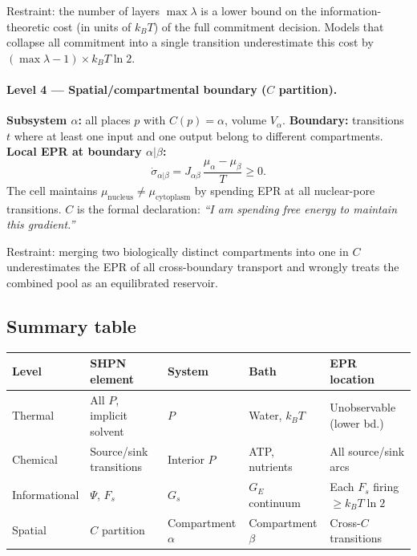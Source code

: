\documentclass[11pt,a4paper]{article}
\begin{document}
\noindent Restraint: the number of layers $\max\lambda$ is a lower bound on
the information-theoretic cost (in units of $k_BT$) of the full commitment
decision.  Models that collapse all commitment into a single transition
underestimate this cost by $(\max\lambda - 1) \times k_BT \ln 2$.

\paragraph{Level 4 --- Spatial/compartmental boundary ($C$ partition).}
\textbf{Subsystem $\alpha$:} all places $p$ with $C(p) = \alpha$, volume
$V_\alpha$.
\textbf{Boundary:} transitions $t$ where at least one input and one output
belong to different compartments.
\textbf{Local EPR at boundary $\alpha|\beta$:}
\[
  \dot\sigma_{\alpha|\beta}
    = J_{\alpha\beta}\,\frac{\mu_\alpha - \mu_\beta}{T} \geq 0.
\]
The cell maintains $\mu_{\mathrm{nucleus}} \neq \mu_{\mathrm{cytoplasm}}$
by spending EPR at all nuclear-pore transitions.
$C$ is the formal declaration: \emph{``I am spending free energy to maintain
this gradient.''}

\noindent Restraint: merging two biologically distinct compartments into one
in $C$ underestimates the EPR of all cross-boundary transport and wrongly
treats the combined pool as an equilibrated reservoir.

\subsection*{Summary table}

\begin{center}
\small
\begin{tabular}{lllll}
\toprule
\textbf{Level} & \textbf{SHPN element} & \textbf{System} & \textbf{Bath}
  & \textbf{EPR location} \\
\midrule
Thermal      & All $P$, implicit solvent & $P$             & Water, $k_BT$
  & Unobservable (lower bd.) \\
Chemical     & Source/sink transitions   & Interior $P$    & ATP, nutrients
  & All source/sink arcs \\
Informational & $\Psi$, $F_s$           & $G_s$           & $G_E$ continuum
  & Each $F_s$ firing $\geq k_BT\ln2$ \\
Spatial      & $C$ partition            & Compartment $\alpha$ & Compartment $\beta$
  & Cross-$C$ transitions \\
\bottomrule
\end{tabular}
\end{center}
\end{document}
